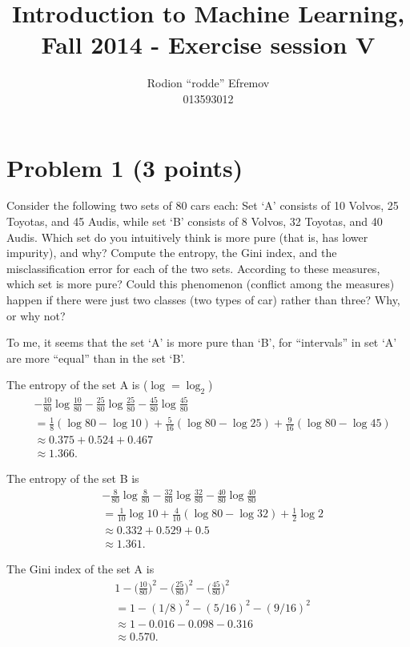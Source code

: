 \documentclass[10pt]{article}
\title{Introduction to Machine Learning, Fall 2014 - Exercise session V}
\author{Rodion ``rodde'' Efremov \\ 013593012}
\begin{document}
 \maketitle

\color{blue}
\section*{Problem 1 (3 points)}
Consider the following two sets of 80 cars each: Set `A' consists of 10 Volvos, 25 Toyotas, and 45 Audis, while set `B' consists of 8 Volvos, 32 Toyotas, and 40 Audis. Which set do you intuitively think is more pure (that is, has lower impurity), and why? Compute the entropy, the Gini index, and the misclassification error for each of the two sets. According to these measures, which set is more pure? Could this phenomenon (conflict among the measures) happen if there were just two classes (two types of car) rather than three? Why, or why not?

\color{black}
To me, it seems that the set `A' is more pure than `B', for ``intervals'' in set `A' are more ``equal'' than in the set `B'.

The entropy of the set A is ($\log = \log_2$)
\begin{align*}
&-\frac{10}{80} \log \frac{10}{80} - \frac{25}{80} \log \frac{25}{80} - \frac{45}{80} \log \frac{45}{80} \\ 
&= \frac{1}{8}(\log 80 - \log 10) +\frac{5}{16} (\log 80 - \log 25) + \frac{9}{16} (\log 80 - \log 45) \\
 &\approx 0.375 + 0.524 + 0.467 \\
 &\approx 1.366.
\end{align*}

The entropy of the set B is
\begin{align*}
&-\frac{8}{80} \log \frac{8}{80} - \frac{32}{80} \log \frac{32}{80} - \frac{40}{80} \log \frac{40}{80} \\
&= \frac{1}{10} \log 10 + \frac{4}{10} (\log 80 - \log 32) + \frac{1}{2} \log 2 \\
&\approx 0.332+ 0.529 + 0.5 \\
&\approx 1.361.
\end{align*}

The Gini index of the set A is
\begin{align*}
&1 - \Bigg( \frac{10}{80} \Bigg)^2 - \Bigg( \frac{25}{80} \Bigg)^2 - \Bigg( \frac{45}{80}  \Bigg)^2 \\
&= 1 - (1 / 8)^2 - (5/16)^2 - (9/16)^2 \\
&\approx 1 - 0.016 - 0.098 - 0.316 \\
&\approx 0.570.
\end{align*}
\end{document}
